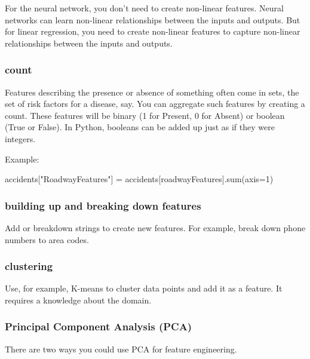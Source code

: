 \documentclass[12pt]{report}
\begin{document}
For the neural network, you don't need to create non-linear features. Neural networks can learn non-linear relationships between the inputs and outputs. But for linear regression, you need to create non-linear features to capture non-linear relationships between the inputs and outputs.


\subsubsection{count}
Features describing the presence or absence of something often come in sets, the set of risk factors for a disease, say. You can aggregate such features by creating a count. These features will be binary (1 for Present, 0 for Absent) or boolean (True or False). In Python, booleans can be added up just as if they were integers.

Example:

accidents["RoadwayFeatures"] = accidents[roadwayFeatures].sum(axis=1)

\subsubsection{building up and breaking down features}
Add or breakdown strings to create new features. For example, break down phone numbers to area codes.

\subsubsection{clustering}
Use, for example, K-means to cluster data points and add it as a feature. It requires a knowledge about the domain.


\subsubsection{Principal Component Analysis (PCA)}
There are two ways you could use PCA for feature engineering.
\end{document}
